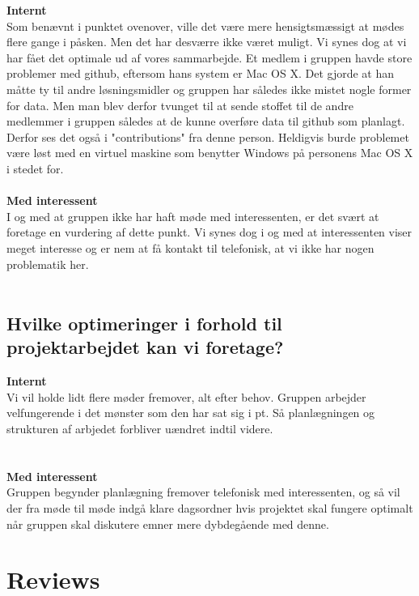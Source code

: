 \documentclass[a4paper,12pt]{article}
\begin{document}
\textbf{Internt}
\\
Som benævnt i punktet ovenover, ville det være mere hensigtsmæssigt at mødes flere gange i påsken. Men det har desværre ikke været muligt. Vi synes dog at vi har fået det optimale ud af vores sammarbejde.
Et medlem i gruppen havde store problemer med github, eftersom hans system er Mac OS X. Det gjorde at han måtte ty til andre løsningsmidler og gruppen har således ikke mistet nogle former for data. Men man blev derfor tvunget til at sende stoffet til de andre medlemmer i gruppen således at de kunne overføre data til github som planlagt. Derfor ses det også i "contributions" fra denne person. Heldigvis burde problemet være løst med en virtuel maskine som benytter Windows på personens Mac OS X i stedet for.
\\
\\
\textbf{Med interessent}
\\
I og med at gruppen ikke har haft møde med interessenten, er det svært at foretage en vurdering af dette punkt. Vi synes dog i og med at interessenten viser meget interesse og er nem at få kontakt til telefonisk, at vi ikke har nogen problematik her. 
\\
\\
\subsection{Hvilke optimeringer i forhold til projektarbejdet kan vi foretage?}

\textbf{Internt}
\\
Vi vil holde lidt flere møder fremover, alt efter behov. Gruppen arbejder velfungerende i det mønster som den har sat sig i pt. Så planlægningen og strukturen af arbjedet forbliver uændret indtil videre.
\\ 
\\
\\
\textbf{Med interessent}
\\
Gruppen begynder planlægning fremover telefonisk med interessenten, og så vil der fra møde til møde indgå klare dagsordner hvis projektet skal fungere optimalt når gruppen skal diskutere emner mere dybdegående med denne.  

\section{Reviews}
\end{document}

